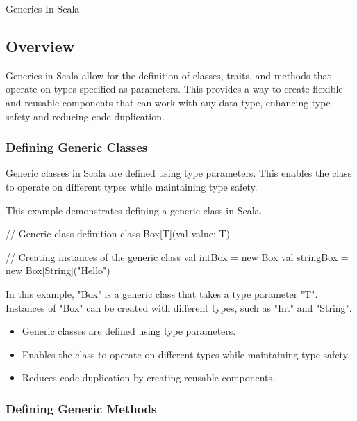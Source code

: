\begin{notes}{Generics In Scala}
    \subsection*{Overview}

    Generics in Scala allow for the definition of classes, traits, and methods that operate on types specified as parameters. This provides a way to create flexible and reusable components that can 
    work with any data type, enhancing type safety and reducing code duplication.
    
    \subsubsection*{Defining Generic Classes}
    
    Generic classes in Scala are defined using type parameters. This enables the class to operate on different types while maintaining type safety.
    
    \begin{highlight}
    
        This example demonstrates defining a generic class in Scala.
    
    \begin{code}[Scala]
    // Generic class definition
    class Box[T](val value: T)
    
    // Creating instances of the generic class
    val intBox = new Box 
    val stringBox = new Box[String]("Hello")
    \end{code}
    
        In this example, "Box" is a generic class that takes a type parameter "T". Instances of "Box" can be created with different types, such as "Int" and "String".
    
        \begin{itemize}
            \item Generic classes are defined using type parameters.
            \item Enables the class to operate on different types while maintaining type safety.
            \item Reduces code duplication by creating reusable components.
        \end{itemize}
    
    \end{highlight}
    
    \subsubsection*{Defining Generic Methods}
    

\end{notes}
